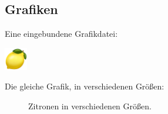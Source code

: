 \subsection*{Grafiken}
Eine eingebundene Grafikdatei:
\begin{center}
  \includegraphics[keepaspectratio,width=1cm]{lemon.png}
\end{center}
\newpage
Die gleiche Grafik, in verschiedenen Größen:
\begin{figure}[h]
  \begin{center}
    \caption{Zitronen in verschiedenen Größen.}
  \end{center}
\end{figure}

